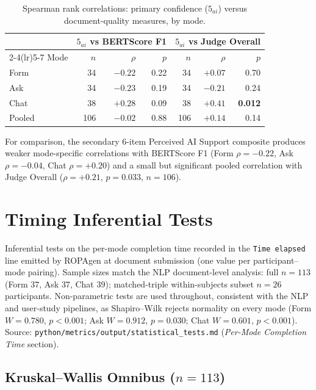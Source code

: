 \begin{table}[htbp]
\centering
\caption{Spearman rank correlations: primary confidence ($5_{ai}$) versus
document-quality measures, by mode.}
\label{tab:app-corr-primary}
\small
\begin{tabular}{@{}l r r r r r r@{}}
\toprule
& \multicolumn{3}{c}{$5_{ai}$ vs BERTScore F1} & \multicolumn{3}{c}{$5_{ai}$ vs Judge Overall} \\
\cmidrule(lr){2-4}\cmidrule(lr){5-7}
Mode  & $n$ & $\rho$ & $p$ & $n$ & $\rho$ & $p$ \\
\midrule
Form  & 34 & $-0.22$ & 0.22 & 34 & $+0.07$ & 0.70 \\
Ask   & 34 & $-0.23$ & 0.19 & 34 & $-0.21$ & 0.24 \\
Chat  & 38 & $+0.28$ & 0.09 & 38 & $+0.41$ & \textbf{0.012} \\
Pooled & 106 & $-0.02$ & 0.88 & 106 & $+0.14$ & 0.14 \\
\bottomrule
\end{tabular}
\end{table}

For comparison, the secondary 6-item Perceived AI Support composite produces
weaker mode-specific correlations with BERTScore F1 (Form $\rho = -0.22$,
Ask $\rho = -0.04$, Chat $\rho = +0.20$) and a small but significant pooled
correlation with Judge Overall ($\rho = +0.21$, $p = 0.033$, $n = 106$).

\section{Timing Inferential Tests}
\label{app:inf-timing}

Inferential tests on the per-mode completion time recorded in the
\texttt{Time elapsed} line emitted by ROPAgen at document submission
(one value per participant--mode pairing). Sample sizes match the NLP
document-level analysis: full $n = 113$ (Form $37$, Ask $37$, Chat
$39$); matched-triple within-subjects subset $n = 26$ participants.
Non-parametric tests are used throughout, consistent with the NLP and
user-study pipelines, as Shapiro--Wilk rejects normality on every
mode (Form $W = 0.780$, $p < 0.001$; Ask $W = 0.912$, $p = 0.030$;
Chat $W = 0.601$, $p < 0.001$). Source:
\texttt{python/metrics/output/statistical\_tests.md} (\emph{Per-Mode
Completion Time} section).

\subsection{Kruskal--Wallis Omnibus ($n = 113$)}

